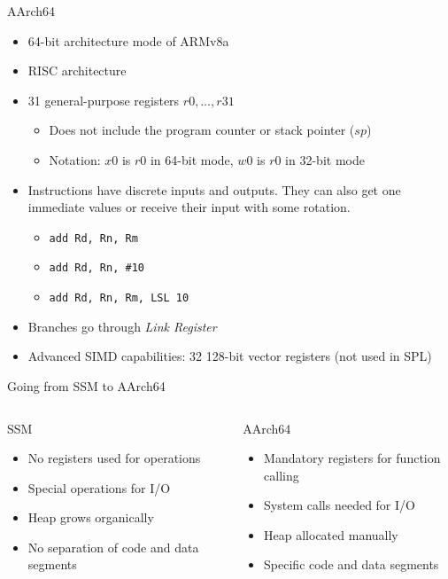 \documentclass[department=icis, slidenumbers=slide, official=true]{beamerruhuisstijl}
\begin{document}
\begin{frame}{AArch64}
    \begin{itemize}
        \item 64-bit architecture mode of ARMv8a
        \item RISC architecture
        \item 31 general-purpose registers $r0, \ldots, r31$
            \begin{itemize}
                \item Does not include the program counter or stack pointer ($sp$)
                \item Notation: $x0$ is $r0$ in 64-bit mode, $w0$ is $r0$ in 32-bit mode
            \end{itemize}
        \item Instructions have discrete inputs and outputs. They can also get one immediate values or receive their input with some rotation.
            \begin{itemize}
                \item \texttt{add Rd, Rn, Rm}
                \item \texttt{add Rd, Rn, \#10}
                \item \texttt{add Rd, Rn, Rm, LSL 10}
            \end{itemize}
        \item Branches go through \emph{Link Register}
        \item Advanced SIMD capabilities: 32 128-bit vector registers (not used in SPL)
    \end{itemize}
\end{frame}

\begin{frame}{Going from SSM to AArch64}
    \begin{columns}
        \begin{block}{SSM}
            \begin{itemize}
                \item No registers used for operations
                \item Special operations for I/O
                \item Heap grows organically
                \item No separation of code and data segments
            \end{itemize}
        \end{block}
        \begin{block}{AArch64}
            \begin{itemize}
                \item Mandatory registers for function calling
                \item System calls needed for I/O
                \item Heap allocated manually
                \item Specific code and data segments
            \end{itemize}
        \end{block}
    \end{columns}
\end{frame}
\end{document}
